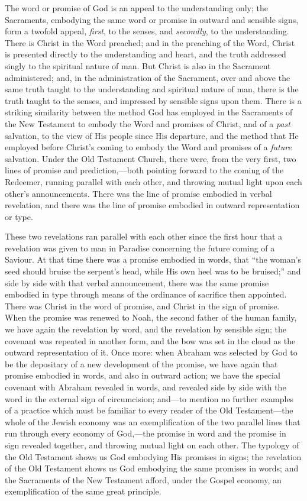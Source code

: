 \documentclass[english,]{book}
\begin{document}
The word or promise of God is an appeal to the understanding only; the Sacraments, embodying the same word or promise in outward and sensible signs, form a twofold appeal, \emph{first}, to the senses, and \emph{secondly}, to the understanding. There is Christ in the Word preached; and in the preaching of the Word, Christ is presented directly to the understanding and heart, and the truth addressed singly to the spiritual nature of man. But Christ is also in the Sacrament administered; and, in the administration of the Sacrament, over and above the same truth taught to the understanding and spiritual nature of man, there is the truth taught to the senses, and impressed by sensible signs upon them. There is a striking similarity between the method God has employed in the Sacraments of the New Testament to embody the Word and promises of Christ, and of a \emph{past} salvation, to the view of His people since His departure, and the method that He employed before Christ's coming to embody the Word and promises of a \emph{future} salvation. Under the Old Testament Church, there were, from the very first, two lines of promise and prediction,---both pointing forward to the coming of the Redeemer, running parallel with each other, and throwing mutual light upon each other's announcements. There was the line of promise embodied in verbal revelation, and there was the line of promise embodied in outward representation or type.

These two revelations ran parallel with each other since the first hour that a revelation was given to man in Paradise concerning the future coming of a Saviour. At that time there was a promise embodied in words, that ``the woman's seed should bruise the serpent's head, while His own heel was to be bruised;'' and side by side with that verbal announcement, there was the same promise embodied in type through means of the ordinance of sacrifice then appointed. There was Christ in the word of promise, and Christ in the sign of promise. When the promise was renewed to Noah, the second father of the human family, we have again the revelation by word, and the revelation by sensible sign; the covenant was repeated in another form, and the bow was set in the cloud as the outward representation of it. Once more: when Abraham was selected by God to be the depositary of a new development of the promise, we have again that promise embodied in words, and also in outward action; we have the special covenant with Abraham revealed in words, and revealed side by side with the word in the external sign of circumcision; and---to mention no further examples of a practice which must be familiar to every reader of the Old Testament---the whole of the Jewish economy was an exemplification of the two parallel lines that run through every economy of God,---the promise in word and the promise in sign revealed together, and throwing mutual light on each other. The typology of the Old Testament shows us God embodying His promises in signs; the revelation of the Old Testament shows us God embodying the same promises in words; and the Sacraments of the New Testament afford, under the Gospel economy, an exemplification of the same great principle.
\end{document}

